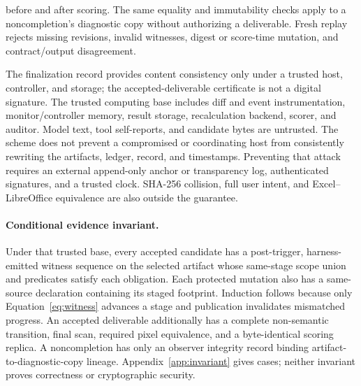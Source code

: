 before and after scoring. The same equality and immutability checks apply to a
noncompletion's diagnostic copy without authorizing a deliverable. Fresh replay
rejects missing revisions, invalid witnesses, digest or score-time mutation,
and contract/output disagreement.

The finalization record provides content consistency only under a trusted host,
controller, and storage; the accepted-deliverable certificate is not a digital
signature. The trusted computing base includes diff and event instrumentation,
monitor/controller memory, result storage, recalculation backend, scorer, and
auditor. Model text, tool self-reports, and candidate bytes are untrusted. The
scheme does not prevent a compromised or coordinating host from consistently
rewriting the artifacts, ledger, record, and timestamps. Preventing that attack
requires an external append-only anchor or transparency log, authenticated
signatures, and a trusted clock. SHA-256 collision, full user intent, and
Excel--LibreOffice equivalence are also outside the guarantee.

\paragraph{Conditional evidence invariant.}
Under that trusted base, every accepted candidate has a post-trigger,
harness-emitted witness sequence on the selected artifact whose same-stage scope
union and predicates satisfy each obligation. Each protected mutation also has
a same-source declaration containing its staged footprint. Induction follows
because only Equation~\ref{eq:witness} advances a stage and publication
invalidates mismatched progress. An accepted deliverable additionally has a
complete non-semantic transition, final scan, required pixel equivalence, and a
byte-identical scoring replica. A noncompletion has only an observer integrity
record binding artifact-to-diagnostic-copy lineage. Appendix~\ref{app:invariant}
gives cases; neither invariant proves correctness or cryptographic security.
